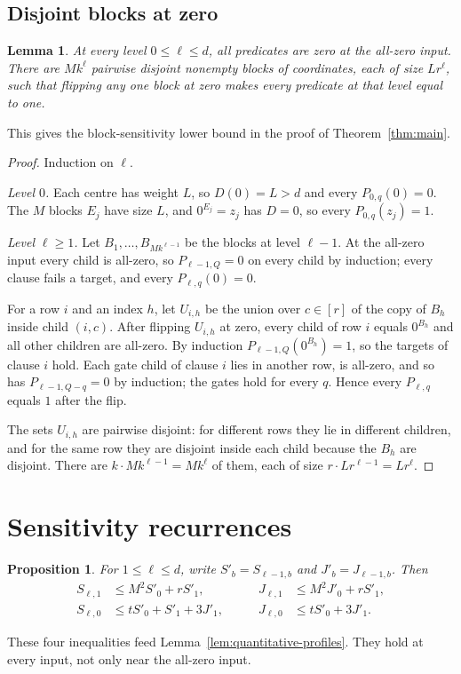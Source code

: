 \documentclass[11pt]{article}
\newtheorem{lemma}[theorem]{Lemma}
\newtheorem{proposition}[theorem]{Proposition}
\theoremstyle{definition}
\theoremstyle{remark}
\begin{document}
\subsection{Disjoint blocks at zero}
\begin{lemma}\label{lem:blocks}
At every level \(0\le\ell\le d\), all predicates are zero at the
all-zero input. There are \(Mk^\ell\) pairwise disjoint nonempty blocks
of coordinates, each of size \(Lr^\ell\), such that flipping any one
block at zero makes every predicate at that level equal to one.
\end{lemma}
This gives the block-sensitivity lower bound in the proof of
Theorem~\ref{thm:main}.
\begin{proof}
Induction on $\ell$.

\emph{Level $0$.} Each centre has weight $L$, so $D(0)=L>d$ and every
$P_{0,q}(0)=0$. The $M$ blocks $E_j$ have size $L$, and $0^{E_j}=z_j$ has
$D=0$, so every $P_{0,q}(z_j)=1$.

\emph{Level $\ell\ge1$.} Let $B_1,\ldots,B_{Mk^{\ell-1}}$ be the blocks at
level $\ell-1$. At the all-zero input every child is all-zero, so
$P_{\ell-1,Q}=0$ on every child by induction; every clause fails a target,
and every $P_{\ell,q}(0)=0$.

For a row $i$ and an index $h$, let $U_{i,h}$ be the union over $c\in[r]$ of
the copy of $B_h$ inside child $(i,c)$. After flipping $U_{i,h}$ at zero,
every child of row $i$ equals $0^{B_h}$ and all other children are
all-zero. By induction $P_{\ell-1,Q}(0^{B_h})=1$, so the targets of clause
$i$ hold. Each gate child of clause $i$ lies in another row, is all-zero, and
so has $P_{\ell-1,Q-q}=0$ by induction; the gates hold for every $q$. Hence
every $P_{\ell,q}$ equals $1$ after the flip.

The sets $U_{i,h}$ are pairwise disjoint: for different rows they lie in
different children, and for the same row they are disjoint inside each child
because the $B_h$ are disjoint. There are $k\cdot Mk^{\ell-1}=Mk^\ell$ of
them, each of size $r\cdot Lr^{\ell-1}=Lr^\ell$.
\end{proof}

\section{Sensitivity recurrences}
\label{sec:recurrences}

\begin{proposition}\label{prop:recurrences}
For $1\leq \ell\leq d$, write
$S'_b=S_{\ell-1,b}$ and $J'_b=J_{\ell-1,b}$.  Then
\begin{equation}\label{eq:recurrences}
\begin{aligned}
 S_{\ell,1}&\leq M^2S'_0+rS'_1,
 &\qquad J_{\ell,1}&\leq M^2J'_0+rS'_1,\\
 S_{\ell,0}&\leq tS'_0+S'_1+3J'_1,
 &\qquad J_{\ell,0}&\leq tS'_0+3J'_1.
\end{aligned}
\end{equation}
\end{proposition}
These four inequalities feed Lemma~\ref{lem:quantitative-profiles}. They hold
at every input, not only near the all-zero input.
\end{document}
